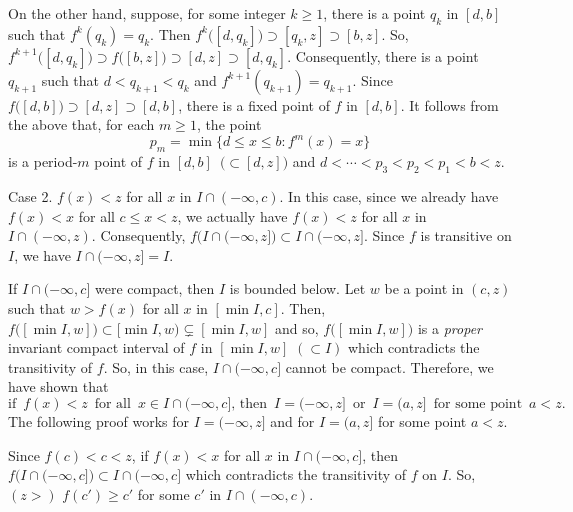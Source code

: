 \documentclass[12pt]{article}
\begin{document}
On the other hand, suppose, for some integer $k \ge 1$, there is a point $q_k$ in $[d, b]$ such that $f^k(q_k) = q_k$.  Then $f^k\bigl([d, q_k]\bigr) \supset [q_k, z] \supset [b,z]$.  So, $f^{k+1}\bigl([d, q_k]\bigr) \supset f\bigl([b, z]\bigr) \supset [d, z] \supset [d, q_k]$.  Consequently, there is a point $q_{k+1}$ such that $d < q_{k+1} < q_k$ and $f^{k+1}(q_{k+1}) = q_{k+1}$.  Since $f\bigl([d, b]\bigr) \supset [d, z] \supset [d, b]$, there is a fixed point of $f$ in $[d, b]$.  It follows from the above that, for each $m \ge 1$, the point $$p_m = \min \big\{ d \le x \le b : f^m(x) = x \big\}$$ is a period-$m$ point of $f$ in $[d, b] \,\,\, \big(\subset [d, z]\big)$ and $d < \cdots < p_3 < p_2 < p_1 < b < z$.  

Case 2.  $f(x) < z$ for all $x$ in $I \cap (-\infty, c)$.  In this case, since we already have $f(x) < x$ for all $c \le x < z$, we actually have $f(x) < z$ for all $x$ in $I \cap (-\infty, z)$.  Consequently, $f\bigr(I \cap (-\infty, z]\bigl) \subset I \cap (-\infty, z]$.  Since $f$ is transitive on $I$, we have $I \cap (-\infty, z] = I$.  

If $I \cap (-\infty, c]$ were compact, then $I$ is bounded below.  Let $w$ be a point in $(c, z)$ such that $w > f(x)$ for all $x$ in $[\min I, c]$.  Then, $f\bigl([\min I, w]\bigr) \subset [\min I, w) \subsetneq [\min I, w]$ and so, $f\bigl([\min I, w]\bigr)$ is a {\it proper} invariant compact interval of $f$ in $[\min I, w]$ $(\subset I)$ which contradicts the transitivity of $f$.  So, in this case, $I \cap (-\infty, c]$ cannot be compact.  Therefore, we have shown that 
$$
\text{if} \,\,\, f(x) < z \,\,\, \text{for all} \,\,\, x \in I \cap (-\infty, c], \, \text{then} \,\,\, I = (-\infty, z] \,\,\, \text{or} \,\,\, I = (a, z] \,\,\, \text{for some point} \,\,\, a < z.
$$
\indent The following proof works for $I = (-\infty, z]$ and for $I = (a, z]$ for some point $a < z$.  

Since $f(c) < c < z$, if $f(x) < x$ for all $x$ in $I \cap (-\infty, c]$, then $f\bigl(I \cap (-\infty, c]\bigr) \subset I \cap (-\infty, c]$ which contradicts the transitivity of $f$ on $I$.  So, $(z >)$ $f(c') \ge c'$ for some $c'$ in $I \cap (-\infty, c)$. 
\end{document}
